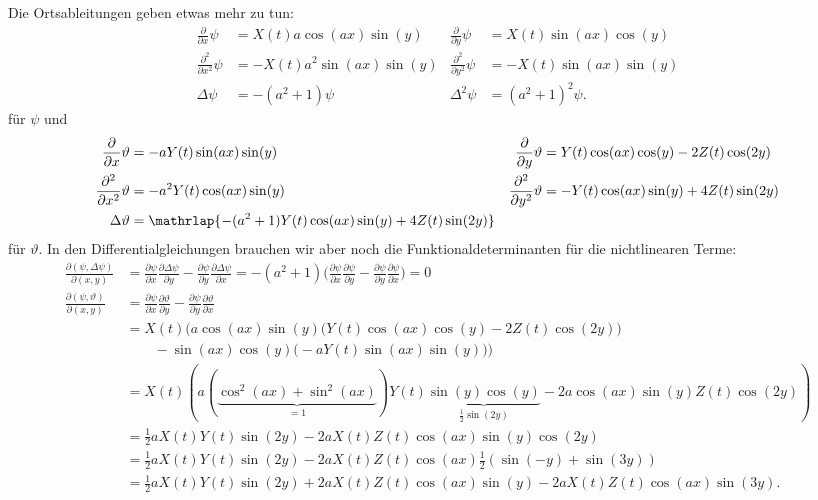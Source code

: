 Die Ortsableitungen geben etwas mehr zu tun:
\begin{align*}
\frac{\partial}{\partial x}\psi
&=
X(t)a\cos(ax)\sin(y)
&
\frac{\partial}{\partial y}\psi
&=
X(t)\sin(ax)\cos(y)
\\
\frac{\partial^2}{\partial x^2}\psi
&=
-X(t)a^2\sin(ax)\sin(y)
&
\frac{\partial^2}{\partial y^2}\psi
&=
-X(t)\sin(ax)\sin(y)
\\
\Delta\psi
&=-(a^2+1)\psi
&
\Delta^2 \psi
&=
(a^2+1)^2\psi.
\end{align*}
für $\psi$ und
\begin{align*}
\frac{\partial}{\partial x}\vartheta
&=
-aY(t) \sin(ax) \sin(y)
&
\frac{\partial}{\partial y}\vartheta
&=
Y(t) \cos(ax) \cos(y) - 2 Z(t)\cos(2y)
\\
\frac{\partial^2}{\partial x^2}\vartheta
&=
-a^2Y(t) \cos(ax) \sin(y)
&
\frac{\partial^2}{\partial y^2}\vartheta
&=
-Y(t) \cos(ax) \sin(y)
+4Z(t)\sin(2y)
\\
\Delta\vartheta
&=\mathrlap{-(a^2+1)Y(t)\cos(ax)\sin(y)+4Z(t)\sin(2y)}
\end{align*}
für $\vartheta$.
In den Differentialgleichungen brauchen wir aber noch die
Funktionaldeterminanten für die nichtlinearen Terme:
\begin{align*}
\frac{\partial(\psi,\Delta\psi)}{\partial(x,y)}
&=
\frac{\partial\psi}{\partial x} \frac{\partial\Delta\psi}{\partial y}
-
\frac{\partial\psi}{\partial y} \frac{\partial\Delta\psi}{\partial x}
=
-(a^2+1)\biggl(
\frac{\partial\psi}{\partial x} \frac{\partial\psi}{\partial y}
-
\frac{\partial\psi}{\partial y} \frac{\partial\psi}{\partial x}
\biggr)
=0
\\
\frac{\partial(\psi,\vartheta)}{\partial(x,y)}
&=
\frac{\partial\psi}{\partial x} \frac{\partial\vartheta}{\partial y}
-
\frac{\partial\psi}{\partial y} \frac{\partial\vartheta}{\partial x}
\\
&=
X(t)\biggl(
a \cos(ax)\sin(y)
\bigl(Y(t) \cos(ax) \cos(y) - 2Z(t)\cos(2y)\bigr)
\\
&\qquad
-
\sin(ax)\cos(y)
\bigl(-aY(t) \sin(ax) \sin(y) \bigr)
\biggr)
\\
&=
X(t)(a(\underbrace{\cos^2(ax)+\sin^2(ax)}_{\displaystyle=1})
Y(t)\underbrace{\sin(y)\cos(y)}_{\displaystyle{\textstyle\frac12}\sin(2y)}-2a\cos(ax)\sin(y)Z(t)\cos(2y))
\\
&=
\frac12aX(t)Y(t) \sin(2y)
-
2a X(t)Z(t) \cos(ax)\sin(y)\cos(2y)
\\
&=
\frac12aX(t)Y(t) \sin(2y)
-
2a X(t)Z(t) \cos(ax)\frac12(\sin(-y)+\sin(3y))
\\
&=
\frac12aX(t)Y(t) \sin(2y)
+
2aX(t)Z(t) \cos(ax)\sin(y)
-
2aX(t)Z(t) \cos(ax)\sin(3y).
\end{align*}
